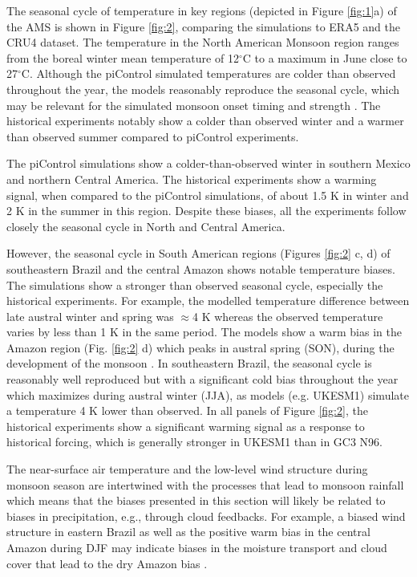 The seasonal cycle of temperature in key regions (depicted in Figure \ref{fig:1}a) of the AMS is shown in Figure \ref{fig:2}, comparing the simulations to ERA5 and the CRU4 dataset.
The temperature in the North American Monsoon region ranges from the boreal winter mean temperature of 12$^\circ$C to a maximum in June close to 27$^\circ$C.
Although the piControl simulated temperatures are colder than observed throughout the year, the models reasonably reproduce the seasonal cycle, which may be relevant for the simulated monsoon onset timing and strength \citep{turrent2009}. The historical experiments notably show a colder than observed winter and a warmer than observed summer compared to piControl experiments.

The piControl simulations show a colder-than-observed winter in southern Mexico and northern Central America. The historical experiments show a warming signal, when compared to the piControl simulations, of about 1.5 K in winter and 2 K in the summer in this region. Despite these biases, all the experiments follow closely the seasonal cycle in North and Central America.

However, the seasonal cycle in South American regions (Figures \ref{fig:2} c, d) of southeastern Brazil and the central Amazon shows notable temperature biases.
The simulations show a stronger than observed seasonal cycle, especially the historical experiments. For example, the modelled temperature difference between late austral winter and spring was $\approx$4 K whereas the observed temperature varies by less than 1 K in the same period. The models show a warm bias in the Amazon region (Fig. \ref{fig:2} d) which peaks in austral spring (SON), during the development of the monsoon \citep{marengo2012}.
In southeastern Brazil, the seasonal cycle is reasonably well reproduced but with a significant cold bias throughout the year which maximizes during austral winter (JJA), as models (e.g. UKESM1) simulate  a temperature 4 K lower than observed.
In all panels of Figure \ref{fig:2}, the historical experiments show a significant warming signal as a response to historical forcing, which is generally stronger in UKESM1 than in GC3 N96. 


The near-surface air temperature and the low-level wind structure during monsoon season are intertwined with the processes that lead to monsoon rainfall which means that the biases presented in this section will likely be related to biases in precipitation, e.g., through cloud feedbacks. For example, a biased wind structure in eastern Brazil as well as the positive warm bias in the central Amazon during DJF may indicate biases in the moisture transport and cloud cover that lead to the dry Amazon bias \citep{jones2013}. %

